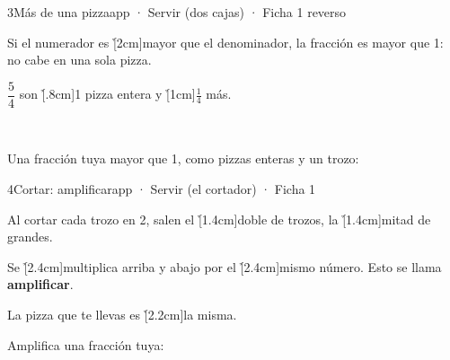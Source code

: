 \documentclass[12pt]{article}
\begin{document}
\begin{cromo}{3}{Más de una pizza}{app · Servir (dos cajas) · Ficha 1 reverso}
\begin{minipage}[c]{.6\linewidth}\raggedright
\completa Si el numerador es \h[2cm]{mayor} que el denominador, la fracción es mayor que 1: no cabe en una sola pizza.\par\vspace{2mm}
$\dfrac{5}{4}$ son \h[.8cm]{1} pizza entera y \h[1cm]{$\frac{1}{4}$} más.
\end{minipage}%
\begin{minipage}[c]{.4\linewidth}\centering{}\ \end{minipage}

\vspace{2mm}
\tuejemplo Una fracción tuya mayor que 1, como pizzas enteras y un trozo:
\end{cromo}

\begin{cromo}{4}{Cortar: amplificar}{app · Servir (el cortador) · Ficha 1}
\begin{minipage}[c]{.6\linewidth}\raggedright
\completa Al cortar cada trozo en 2, salen el \h[1.4cm]{doble} de trozos, la \h[1.4cm]{mitad} de grandes.\par\vspace{2mm}
Se \h[2.4cm]{multiplica} arriba y abajo por el \h[2.4cm]{mismo número}. Esto se llama \textbf{amplificar}.\par\vspace{2mm}
La pizza que te llevas es \h[2.2cm]{la misma}.
\end{minipage}%
\begin{minipage}[c]{.4\linewidth}\centering{}\end{minipage}

\vspace{2mm}
\tuejemplo Amplifica una fracción tuya:
\end{cromo}
\end{document}
